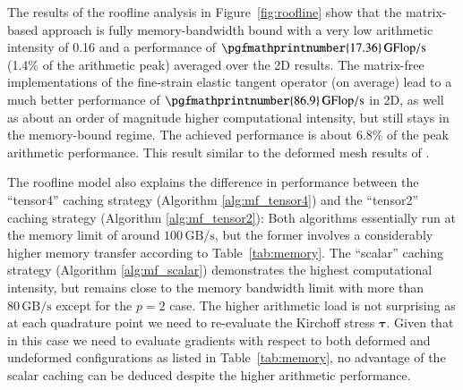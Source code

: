 \documentclass[AMA,STIX1COL]{WileyNJD-v2}
\newcommand*{\gz}[1]{\boldsymbol{#1}}
\begin{document}
The results of the roofline analysis in Figure~\ref{fig:roofline} show that the matrix-based approach is fully memory-bandwidth bound with a very low arithmetic intensity of 0.16 and a performance of $\pgfmathprintnumber{17.36}\,\rm{GFlop/s}$ (1.4\% of the arithmetic peak) averaged over the 2D results.
{\color{red}
The matrix-free implementations of the fine-strain elastic tangent operator (on average) lead to a much better performance of
$\pgfmathprintnumber{86.9}\,\rm{GFlop/s}$ in 2D, as well as about an order of magnitude higher computational intensity, but still stays in the memory-bound regime.
The achieved performance is about 6.8\% of the peak arithmetic performance. This result similar to the deformed mesh results of \cite[Figure 18]{kronbichler2017fast}.
}

{\color{red}
The roofline model also explains the difference in performance between the ``tensor4'' caching strategy (Algorithm \ref{alg:mf_tensor4}) and the ``tensor2'' caching strategy (Algorithm \ref{alg:mf_tensor2}): Both algorithms essentially run at the memory limit of around $100\, \text{GB/s}$, but the former involves a considerably higher memory transfer according to Table~\ref{tab:memory}.
The ``scalar'' caching strategy (Algorithm \ref{alg:mf_scalar}) demonstrates the highest computational intensity, but remains close to the memory bandwidth limit with more than $80\, \text{GB/s}$ except for the $p=2$ case. The higher arithmetic load is not surprising as at each quadrature point we need to re-evaluate the Kirchoff stress $\gz \tau$.
Given that in this case we need to evaluate gradients with respect to both deformed and undeformed configurations as listed in Table~\ref{tab:memory}, no advantage of the scalar caching can be deduced despite the higher arithmetic performance.
}
\end{document}

